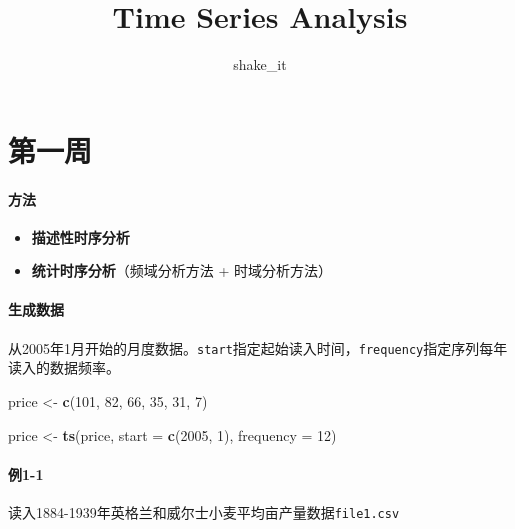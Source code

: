 \documentclass[]{article}
\title{Time Series Analysis}
\author{shake\_it}
\date{}
\newenvironment{Shaded}{\begin{snugshade}}{\end{snugshade}}
\newcommand{\DataTypeTok}[1]{\textcolor[rgb]{0.13,0.29,0.53}{#1}}
\newcommand{\DecValTok}[1]{\textcolor[rgb]{0.00,0.00,0.81}{#1}}
\newcommand{\KeywordTok}[1]{\textcolor[rgb]{0.13,0.29,0.53}{\textbf{#1}}}
\newcommand{\NormalTok}[1]{#1}
\newcommand{\StringTok}[1]{\textcolor[rgb]{0.31,0.60,0.02}{#1}}
\providecommand{\tightlist}{%
  \setlength{\itemsep}{0pt}\setlength{\parskip}{0pt}}
\let\oldparagraph\paragraph
\renewcommand{\paragraph}[1]{\oldparagraph{#1}\mbox{}}
\begin{document}
\maketitle

\hypertarget{ux7b2cux4e00ux5468}{%
\section{第一周}\label{ux7b2cux4e00ux5468}}

\hypertarget{ux65b9ux6cd5}{%
\paragraph{方法}\label{ux65b9ux6cd5}}

\begin{itemize}
\tightlist
\item
  \textbf{描述性时序分析}
\item
  \textbf{统计时序分析}（频域分析方法 + 时域分析方法）
\end{itemize}

\hypertarget{ux751fux6210ux6570ux636e}{%
\paragraph{生成数据}\label{ux751fux6210ux6570ux636e}}

从2005年1月开始的月度数据。\texttt{start}指定起始读入时间，\texttt{frequency}指定序列每年读入的数据频率。

\begin{Shaded}
\begin{Highlighting}[]
\NormalTok{price <-}\StringTok{ }\KeywordTok{c}\NormalTok{(}\DecValTok{101}\NormalTok{, }\DecValTok{82}\NormalTok{, }\DecValTok{66}\NormalTok{, }\DecValTok{35}\NormalTok{, }\DecValTok{31}\NormalTok{, }\DecValTok{7}\NormalTok{)}

\NormalTok{price <-}\StringTok{ }\KeywordTok{ts}\NormalTok{(price, }\DataTypeTok{start =} \KeywordTok{c}\NormalTok{(}\DecValTok{2005}\NormalTok{, }\DecValTok{1}\NormalTok{), }\DataTypeTok{frequency =} \DecValTok{12}\NormalTok{)}
\end{Highlighting}
\end{Shaded}

\hypertarget{ux4f8b1-1}{%
\paragraph{例1-1}\label{ux4f8b1-1}}

读入1884-1939年英格兰和威尔士小麦平均亩产量数据\texttt{file1.csv}
\end{document}
